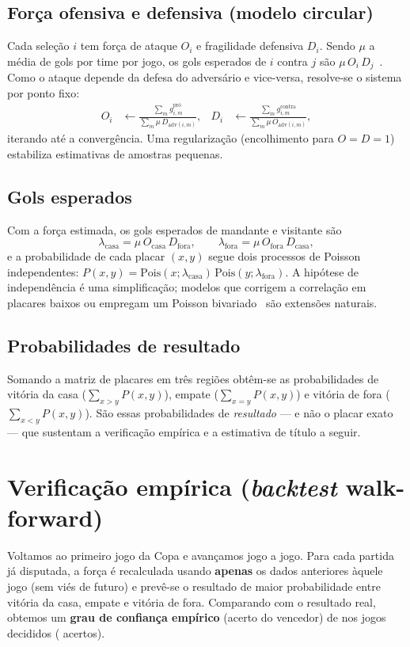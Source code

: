 \documentclass[11pt,a4paper]{article}
\begin{document}
\subsection{Força ofensiva e defensiva (modelo circular)}\label{sec:forca}
Cada seleção $i$ tem força de ataque $O_i$ e fragilidade defensiva $D_i$. Sendo
$\mu$ a média de gols por time por jogo, os gols esperados de $i$ contra $j$ são
$\mu\,O_i\,D_j$~\cite{maher1982}. Como o ataque depende da defesa do adversário e
vice-versa, resolve-se o sistema por ponto fixo:
\begin{align}
O_i &\leftarrow \frac{\sum_{m} g^{\text{pró}}_{i,m}}
                     {\sum_{m} \mu\,D_{\text{adv}(i,m)}}, &
D_i &\leftarrow \frac{\sum_{m} g^{\text{contra}}_{i,m}}
                     {\sum_{m} \mu\,O_{\text{adv}(i,m)}},
\end{align}
iterando até a convergência. Uma regularização (encolhimento para $O=D=1$)
estabiliza estimativas de amostras pequenas.

\subsection{Gols esperados}
Com a força estimada, os gols esperados de mandante e visitante são
\begin{equation}
\lambda_{\text{casa}} = \mu\,O_{\text{casa}}\,D_{\text{fora}}, \qquad
\lambda_{\text{fora}} = \mu\,O_{\text{fora}}\,D_{\text{casa}},
\end{equation}
e a probabilidade de cada placar $(x,y)$ segue dois processos de Poisson
independentes: $P(x,y) = \mathrm{Pois}(x;\lambda_{\text{casa}})\,
\mathrm{Pois}(y;\lambda_{\text{fora}})$. A hipótese de independência é uma
simplificação; modelos que corrigem a correlação em placares baixos ou empregam
um Poisson bivariado~\cite{dixoncoles1997,karlis2003} são extensões naturais.

\subsection{Probabilidades de resultado}
Somando a matriz de placares em três regiões obtêm-se as probabilidades de
vitória da casa ($\sum_{x>y} P(x,y)$), empate ($\sum_{x=y} P(x,y)$) e vitória de
fora ($\sum_{x<y} P(x,y)$). São essas probabilidades de \emph{resultado} — e não
o placar exato — que sustentam a verificação empírica e a estimativa de título a
seguir.

\section{Verificação empírica (\emph{backtest} walk-forward)}
Voltamos ao primeiro jogo da Copa e avançamos jogo a jogo. Para cada partida já
disputada, a força é recalculada usando \textbf{apenas} os dados anteriores
àquele jogo (sem viés de futuro) e prevê-se o resultado de maior probabilidade
entre vitória da casa, empate e vitória de fora. Comparando com o resultado real,
obtemos um \textbf{grau de confiança empírico} (acerto do vencedor) de
\textbf{\grauConfianca} nos \nDecididos{} jogos decididos (\nAcertos{} acertos).
\end{document}
